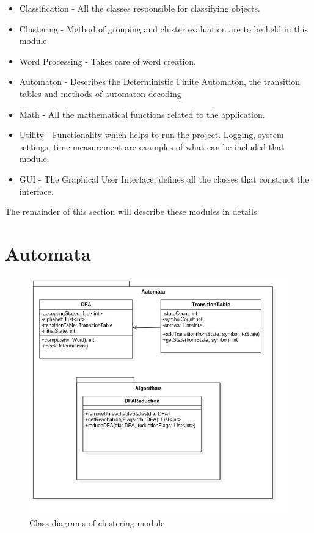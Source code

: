 \documentclass{mini}
\begin{document}
\begin{itemize}
    
    \item 
    {{Classification}} - All the classes responsible for classifying objects.
    \item 
    {{Clustering}} - Method of grouping and cluster evaluation are to be held in this module.
    \item
    {{Word Processing}} - Takes care of word creation.
    \item 
    {{Automaton}} - Describes the Deterministic Finite Automaton, the transition tables and methods of automaton decoding 
    \item 
    {{Math}} - All the mathematical functions related to the application.
    \item 
    {{Utility}} - Functionality which helps to run the project. Logging, system settings, time measurement are examples of what can be included that module.
    \item 
    {{GUI}} - The Graphical User Interface, defines all the classes that construct the interface.
    
\end{itemize}

The remainder of this section will describe these modules in details.

\section{Automata}
\begin{figure}[H]
    \centering
    \includegraphics[width=1.0\textwidth]{../uml/classes/automata.jpg}
    \caption{Class diagrams of clustering module}
    \label{fig:automata_class}
\end{figure}
\end{document}
